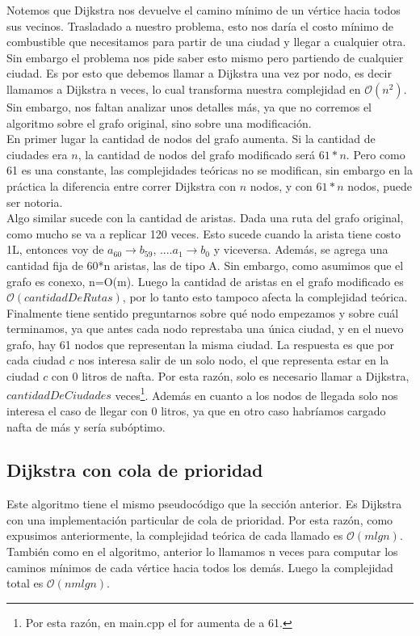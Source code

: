\indent Notemos que Dijkstra nos devuelve el camino mínimo de un vértice hacia todos sus vecinos. Trasladado a nuestro problema, esto nos daría el costo mínimo de combustible que necesitamos para partir de una ciudad y llegar a cualquier otra. Sin embargo el problema nos pide saber esto mismo pero partiendo de cualquier ciudad. Es por esto que debemos llamar a Dijkstra una vez por nodo, es decir llamamos a Dijkstra n veces, lo cual transforma nuestra complejidad en $\mathcal{O}(n^{2})$. \\
\indent Sin embargo, nos faltan analizar unos detalles más, ya que no corremos el algoritmo sobre el grafo original, sino sobre una modificación. \\
\indent En primer lugar la cantidad de nodos del grafo aumenta. Si la cantidad de ciudades era $n$, la cantidad de nodos del grafo modificado será $61*n$. Pero como 61 es una constante, las complejidades teóricas no se modifican, sin embargo en la práctica la diferencia entre correr Dijkstra con $n$ nodos, y con $61*n$ nodos, puede ser notoria.\\
\indent Algo similar sucede con la cantidad de aristas. Dada una ruta del grafo original, como mucho se va a replicar 120 veces. Esto sucede cuando la arista tiene costo 1L, entonces voy de $a_{60}\rightarrow b_{59}$, ....$a_{1} \rightarrow b_{0}$ y viceversa. Además, se agrega una cantidad fija de 60*n aristas, las de tipo A. Sin embargo, como asumimos que el grafo es conexo, n=O(m). Luego la cantidad de aristas en el grafo modificado es $\mathcal{O}(cantidadDeRutas)$, por lo tanto esto tampoco afecta la complejidad teórica. \\
\indent Finalmente tiene sentido preguntarnos sobre qué nodo empezamos y sobre cuál terminamos, ya que antes cada nodo represtaba una única ciudad, y en el nuevo grafo, hay 61 nodos que representan la misma ciudad. La respuesta es que por cada ciudad $c$ nos interesa salir de un solo nodo, el que representa estar en la ciudad $c$ con 0 litros de nafta. Por esta razón, solo es necesario llamar a Dijkstra, $cantidadDeCiudades$ veces\footnote{Por esta razón, en main.cpp el for aumenta de a 61.}. Además en cuanto a los nodos de llegada solo nos interesa el caso de llegar con 0 litros, ya que en otro caso habríamos cargado nafta de más y sería subóptimo.

\subsection{Dijkstra con cola de prioridad}
Este algoritmo tiene el mismo pseudocódigo que la sección anterior. Es Dijkstra con una implementación particular de cola de prioridad. Por esta razón, como expusimos anteriormente, la complejidad teórica de cada llamado es $\mathcal{O}(mlgn)$. \\
\indent También como en el algoritmo, anterior lo llamamos n veces para computar los caminos mínimos de cada vértice hacia todos los demás. Luego la complejidad total es $\mathcal{O}(nmlgn)$.

